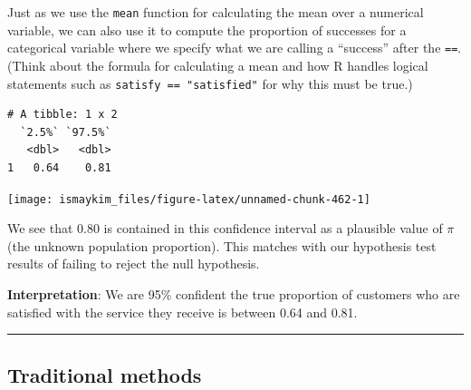 \documentclass[12pt, krantz2,]{krantz}
\makeatletter
\newenvironment{Shaded}{\begin{snugshade}}{\end{snugshade}}
\newcommand{\DataTypeTok}[1]{\textcolor[rgb]{0.27,0.27,0.27}{#1}}
\newcommand{\KeywordTok}[1]{\textcolor[rgb]{0.27,0.27,0.27}{\textbf{#1}}}
\newcommand{\NormalTok}[1]{#1}
\newcommand{\OperatorTok}[1]{\textcolor[rgb]{0.43,0.43,0.43}{\textbf{#1}}}
\newcommand{\StringTok}[1]{\textcolor[rgb]{0.5,0.5,0.5}{#1}}
\newenvironment{kframe}{%
\medskip{}
\setlength{\fboxsep}{.8em}
 \def\at@end@of@kframe{}%
 \ifinner\ifhmode%
  \def\at@end@of@kframe{\end{minipage}}%
  \begin{minipage}{\columnwidth}%
 \fi\fi%
 \def\FrameCommand##1{\hskip\@totalleftmargin \hskip-\fboxsep
 \colorbox{shadecolor}{##1}\hskip-\fboxsep
     \hskip-\linewidth \hskip-\@totalleftmargin \hskip\columnwidth}%
 \MakeFramed {\advance\hsize-\width
   \@totalleftmargin\z@ \linewidth\hsize
   \@setminipage}}%
 {\par\unskip\endMakeFramed%
 \at@end@of@kframe}
\renewenvironment{Shaded}{\begin{kframe}}{\end{kframe}}
\makeatother
\begin{document}
Just as we use the \texttt{mean} function for calculating the mean over a numerical variable, we can also use it to compute the proportion of successes for a categorical variable where we specify what we are calling a ``success'' after the \texttt{==}. (Think about the formula for calculating a mean and how R handles logical statements such as \texttt{satisfy\ ==\ "satisfied"} for why this must be true.)

\begin{Shaded}
\end{Shaded}

\begin{verbatim}
# A tibble: 1 x 2
  `2.5%` `97.5%`
   <dbl>   <dbl>
1   0.64    0.81
\end{verbatim}

\begin{Shaded}
\end{Shaded}

\begin{center}\texttt{[image: ismaykim\_files/figure-latex/unnamed-chunk-462-1]} \end{center}

We see that 0.80 is contained in this confidence interval as a plausible value of \(\pi\) (the unknown population proportion). This matches with our hypothesis test results of failing to reject the null hypothesis.

\textbf{Interpretation}: We are 95\% confident the true proportion of customers who are satisfied with the service they receive is between 0.64 and 0.81.

\begin{center}\rule{0.5\linewidth}{\linethickness}\end{center}

\hypertarget{traditional-methods-1}{%
\subsection{Traditional methods}\label{traditional-methods-1}}
\end{document}
